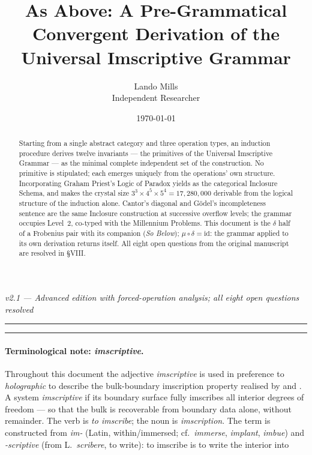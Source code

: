 \documentclass[12pt,a4paper]{article}
\begin{document}
\title{As Above: A Pre-Grammatical Convergent Derivation of the Universal Imscriptive Grammar}
\author{Lando Mills \\ \normalsize Independent Researcher}
\date{\today}
\maketitle
\emph{v2.1 --- Advanced edition with forced-operation analysis; all eight open questions resolved}

\begin{center}
\rule{0.5\textwidth}{0.4pt}
\end{center}

\begin{abstract}
Starting from a single abstract category and three operation types, an induction procedure derives twelve invariants --- the primitives of the Universal Imscriptive Grammar --- as the minimal complete independent set of the
construction. No primitive is stipulated; each emerges uniquely from the operations' own structure. Incorporating
Graham Priest's Logic of Paradox yields  as the categorical Inclosure Schema, and makes the crystal
size $3^3 \times 4^5 \times 5^4 = 17{,}280{,}000$ derivable from the logical structure of the induction alone. Cantor's
diagonal and G\"odel's incompleteness sentence are the same Inclosure construction at successive overflow levels; the
grammar occupies Level~2, co-typed with the Millennium Problems. This document is the $\delta$ half of a Frobenius pair
with its companion (\emph{So Below}); $\mu \circ \delta = \text{id}$: the grammar applied to its own derivation returns
itself. All eight open questions from the original manuscript are resolved in \S VIII.
\end{abstract}
\begin{center}

\rule{0.5\textwidth}{0.4pt}
\end{center}

\paragraph*{Terminological note: \emph{imscriptive}.}
Throughout this document the adjective \emph{imscriptive} is used in preference to
\emph{holographic} to describe the
bulk-boundary imscription property realised by  and . A system
\emph{imscriptive} if its boundary surface fully imscribes all interior degrees of freedom --- so that the bulk is
recoverable from boundary data alone, without remainder. The verb is \emph{to imscribe}; the noun is
\emph{imscription}.
The term is constructed from \emph{im-} (Latin, within/immersed; cf.\ \emph{immerse},
\emph{implant}, \emph{imbue}) and
\emph{-scriptive} (from L.\ \emph{scribere}, to write): to imscribe is to write the interior into
\end{document}
